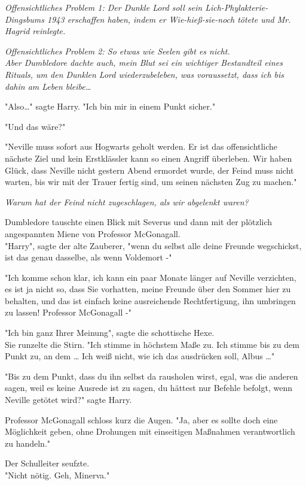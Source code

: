 {\emph{Offensichtliches Problem 1: Der Dunkle Lord soll sein Lich-Phylakterie-Dingsbums 1943 erschaffen haben, indem er Wie-hieß-sie-noch tötete und Mr. Hagrid reinlegte.}

\emph{Offensichtliches Problem 2: So etwas wie Seelen gibt es nicht.}\\ \emph{Aber Dumbledore dachte auch, mein Blut sei ein wichtiger Bestandteil eines Rituals, um den Dunklen Lord wiederzubeleben, was voraussetzt, dass ich bis dahin am Leben bleibe…}

"Also…" sagte Harry. "Ich bin mir in einem Punkt sicher."

"Und das wäre?"

"Neville muss sofort aus Hogwarts geholt werden. Er ist das offensichtliche nächste Ziel und kein Erstklässler kann so einen Angriff überleben. Wir haben Glück, dass Neville nicht gestern Abend ermordet wurde, der Feind muss nicht warten, bis wir mit der Trauer fertig sind, um seinen nächsten Zug zu machen."

\emph{Warum hat der Feind nicht zugeschlagen, als wir abgelenkt waren?}

Dumbledore tauschte einen Blick mit Severus und dann mit der plötzlich angespannten Miene von Professor McGonagall.\\ "Harry", sagte der alte Zauberer, "wenn du selbst alle deine Freunde wegschickst, ist das genau dasselbe, als wenn Voldemort -"

"Ich komme schon klar, ich kann ein paar Monate länger auf Neville verzichten, es ist ja nicht so, dass Sie vorhatten, meine Freunde über den Sommer hier zu behalten, und das ist einfach keine ausreichende Rechtfertigung, ihn umbringen zu lassen! Professor McGonagall -"

"Ich bin ganz Ihrer Meinung", sagte die schottische Hexe.\\ Sie runzelte die Stirn. "Ich stimme in höchstem Maße zu. Ich stimme bis zu dem Punkt zu, an dem … Ich weiß nicht, wie ich das ausdrücken soll, Albus …"

"Bis zu dem Punkt, dass du ihn selbst da rausholen wirst, egal, was die anderen sagen, weil es keine Ausrede ist zu sagen, du hättest nur Befehle befolgt, wenn Neville getötet wird?" sagte Harry.

Professor McGonagall schloss kurz die Augen. "Ja, aber es sollte doch eine Möglichkeit geben, ohne Drohungen mit einseitigen Maßnahmen verantwortlich zu handeln."

Der Schulleiter seufzte.\\ "Nicht nötig. Geh, Minerva."

}
